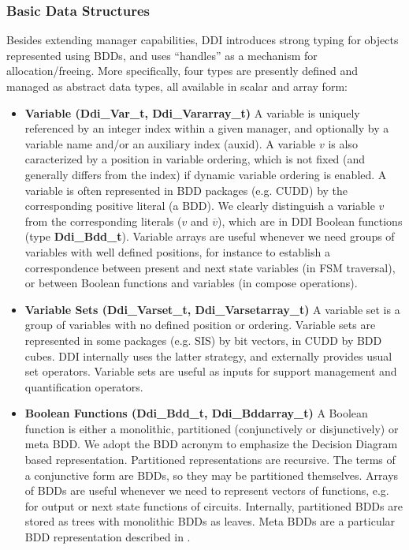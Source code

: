 \subsubsection{Basic Data Structures} 

Besides extending manager capabilities, DDI introduces strong typing
for objects represented using BDDs, and uses ``handles'' as a
mechanism for allocation/freeing. More specifically, four types 
are presently defined and managed as abstract data types, 
all available in scalar and array form:

\begin{itemize}

\item
{\bf Variable (Ddi\_Var\_t, Ddi\_Vararray\_t)}
A variable is uniquely referenced by an integer index within a given manager, 
and optionally by a variable name and/or an auxiliary index (auxid). 
A variable $v$ is also caracterized by a position in variable
ordering, which is not fixed (and generally differs from the index) if
dynamic variable ordering is enabled. 
A variable is often represented in BDD packages (e.g. CUDD) by the
corresponding positive literal (a BDD).
We clearly distinguish a variable $v$ from the corresponding
literals ($v$ and $\overline{v}$), which
are in DDI Boolean functions (type {\bf Ddi\_Bdd\_t}).
Variable arrays are useful whenever we need groups of variables with
well
defined positions, for instance to establish a correspondence between
present and next state variables (in FSM traversal), or between
Boolean functions and variables (in compose operations).

\item
{\bf Variable Sets (Ddi\_Varset\_t, Ddi\_Varsetarray\_t)}
A variable set is a group of variables with no defined position or
ordering. Variable sets are represented in some packages (e.g. SIS) by
bit vectors, in CUDD by BDD cubes.
DDI internally uses the latter strategy, and externally provides 
usual set operators. Variable sets are useful as inputs for
support management and quantification operators.

\item
{\bf Boolean Functions (Ddi\_Bdd\_t, Ddi\_Bddarray\_t)}
A Boolean function is either a monolithic, partitioned (conjunctively
or disjunctively) or meta BDD. We adopt the BDD 
acronym to emphasize the Decision Diagram based representation.
Partitioned representations are recursive. The terms of a
conjunctive form are BDDs, so they may be partitioned themselves.
Arrays of BDDs are useful whenever we need to represent vectors of
functions, e.g. for output or next state functions of circuits. 
Internally, partitioned BDDs are stored as trees with monolithic BDDs
as leaves.
Meta BDDs are a particular BDD representation described in
\cite{MetaBDDs}.


\end{itemize}
